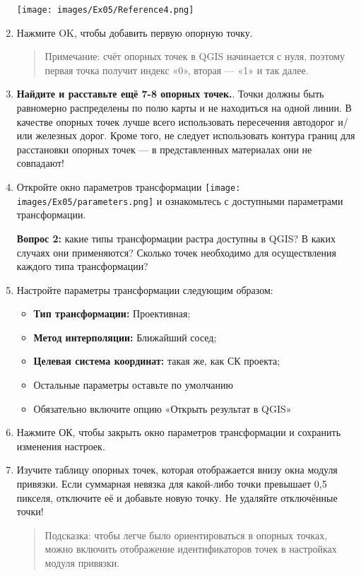 \documentclass[
  12pt,
]{book}
\providecommand{\tightlist}{%
  \setlength{\itemsep}{0pt}\setlength{\parskip}{0pt}}
\begin{document}
\begin{enumerate}
  \texttt{[image: images/Ex05/Reference4.png]}
\item
  Нажмите OK, чтобы добавить первую опорную точку.

  \begin{quote}
  Примечание: счёт опорных точек в QGIS начинается с нуля, поэтому первая точка получит индекс «0», вторая --- «1» и так далее.
  \end{quote}
\item
  \textbf{Найдите и расставьте ещё 7-8 опорных точек.}. Точки должны быть равномерно распределены по полю карты и не находиться на одной линии. В качестве опорных точек лучше всего использовать пересечения автодорог и/или железных дорог. Кроме того, не следует использовать контура границ для расстановки опорных точек --- в представленных материалах они не совпадают!
\item
  Откройте окно параметров трансформации \texttt{[image: images/Ex05/parameters.png]} и ознакомьтесь с доступными параметрами трансформации.

  \textbf{Вопрос 2:} какие типы трансформации растра доступны в QGIS? В каких случаях они применяются? Сколько точек необходимо для осуществления каждого типа трансформации?
\item
  Настройте параметры трансформации следующим образом:

  \begin{itemize}
  \tightlist
  \item
    \textbf{Тип трансформации:} Проективная;
  \item
    \textbf{Метод интерполяции:} Ближайший сосед;
  \item
    \textbf{Целевая система координат:} такая же, как СК проекта;
  \item
    Остальные параметры оставьте по умолчанию
  \item
    Обязательно включите опцию «Открыть результат в QGIS»
  \end{itemize}
\item
  Нажмите ОК, чтобы закрыть окно параметров трансформации и сохранить изменения настроек.
\item
  Изучите таблицу опорных точек, которая отображается внизу окна модуля привязки. Если суммарная невязка для какой-либо точки превышает 0,5 пикселя, отключите её и добавьте новую точку. Не удаляйте отключённые точки!

  \begin{quote}
  Подсказка: чтобы легче было ориентироваться в опорных точках, можно включить отображение идентификаторов точек в настройках модуля привязки.
  \end{quote}


\end{enumerate}
\end{document}
